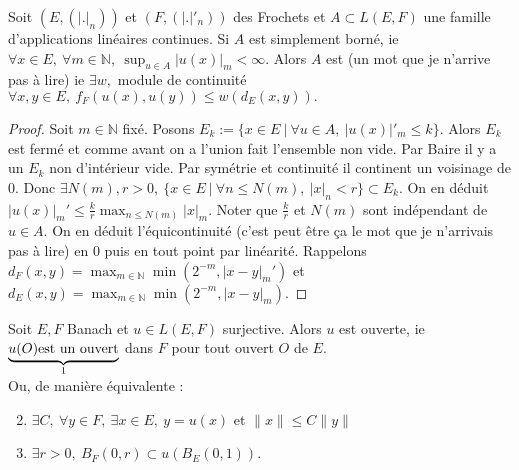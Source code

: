 \begin{theoreme}
    Soit $(E,(|.|_n))$ et $(F,(|.|'_n))$ des Frochets et $A\subset L(E,F)$ une famille d'applications linéaires continues. Si $A$ est simplement borné, ie $\forall x\in E,\ \forall m\in \mathbb{N} ,\ \sup_{u\in A}|u(x)|_m<\infty . $ Alors $A$ est (un mot que je n'arrive pas à lire) ie $\exists w,$ module de continuité $\forall x,y\in E,\ f_F(u(x),u(y))\le w(d_E(x,y)). $
\end{theoreme}
\begin{proof}
    Soit $m\in \mathbb{N} $ fixé. Posons $E_k:=\{x\in E\ |\ \forall u\in A,\ |u(x)|'_m\le k \}  $. Alors $E_k$ est fermé et comme avant on a l'union fait l'ensemble non vide. Par Baire il y a un $E_k$ non d'intérieur vide. Par symétrie et continuité il continent un voisinage de 0. Donc $\exists N(m), r>0,\ \{x\in E\ |\ \forall n\le N(m),\ |x|_n<r \} \subset E_k.$ On en déduit $|u(x)|_m'\le \frac{k}{r}\max_{n\le N(m)}|x|_m.$ Noter que $\frac{k}{r}$ et $N(m)$ sont indépendant de $u\in A.$ On en déduit l'équicontinuité (c'est peut être ça le mot que je n'arrivais pas à lire) en 0 puis en tout point par linéarité. Rappelons $d_F(x,y)=\max_{m\in \mathbb{N} }\min(2^{-m},|x-y|_m')$ et $d_E(x,y)=\max_{m\in \mathbb{N} }\min(2^{-m},|x-y|_m)$.
\end{proof}
\begin{theoreme}
    Soit $E,F$ Banach et $u\in L(E,F)$ surjective. Alors $u$ est ouverte, ie $\underbrace{u(O) \text{est un ouvert}}_{\mathclap{\text{1}}}$ dans $F$ pour tout ouvert $O$ de $E$.\\
    Ou, de manière équivalente :
    \begin{enumerate} \setcounter{enumi}{1}
        \item $\exists C,\ \forall y\in F,\ \exists x\in E,\ y=u(x) $ et $\|x\|\le C\|y\|$
        \item $\exists r>0,\ B_F(0,r)\subset u(B_E(0,1))$.
    \end{enumerate}
\end{theoreme}
